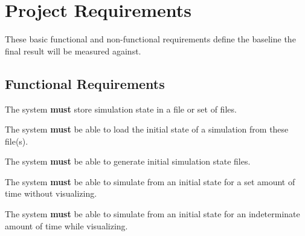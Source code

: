 
\chapter{Project Requirements}
\label{sec:Requirements}
These basic functional and non-functional requirements define the baseline the final result will be measured against.

\newcommand{\must}[0]{\textbf{must}}
\newcommand{\should}[0]{\textbf{should}}
\newcommand{\shouldnt}[0]{\textbf{should not}}

\section{Functional Requirements}
\begin{reqF}
    \item \label{req:StoreState} The system \must{} store simulation state in a file or set of files.
    \item \label{req:LoadState} The system \must{} be able to load the initial state of a simulation from these file(s).
    \item \label{req:GenerateState} The system \must{} be able to generate initial simulation state files.
    \item \label{req:HeadlessSim} The system \must{} be able to simulate from an initial state for a set amount of time without visualizing.
    \item \label{req:VizSim} The system \must{} be able to simulate from an initial state for an indeterminate amount of time while visualizing.
\end{reqF}
